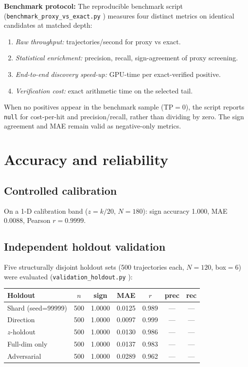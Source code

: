 \documentclass[11pt]{article}
\begin{document}
\textbf{Benchmark protocol:} The reproducible benchmark script (\texttt{benchmark\_proxy\_vs\_exact.py} \cite{deltaproxy_repo}) measures four distinct metrics on identical candidates at matched depth:

\begin{enumerate}
\item \emph{Raw throughput:} trajectories/second for proxy vs exact.
\item \emph{Statistical enrichment:} precision, recall, sign-agreement of proxy screening.
\item \emph{End-to-end discovery speed-up:} GPU-time per exact-verified positive.
\item \emph{Verification cost:} exact arithmetic time on the selected tail.
\end{enumerate}

When no positives appear in the benchmark sample ($\text{TP} = 0$), the script reports \texttt{null} for cost-per-hit and precision/recall, rather than dividing by zero. The sign agreement and MAE remain valid as negative-only metrics.

\section{Accuracy and reliability}
\label{sec:validation}

\subsection{Controlled calibration}

On a 1-D calibration band ($z = k/20$, $N=180$): sign accuracy 1.000, MAE 0.0088, Pearson $r = 0.9999$.

\subsection{Independent holdout validation}

Five structurally disjoint holdout sets (500 trajectories each, $N{=}120$, box${=}6$) were evaluated (\texttt{validation\_holdout.py} \cite{deltaproxy_repo}):

\begin{center}
\begin{tabular}{lcccccc}
\toprule
Holdout & $n$ & sign & MAE & $r$ & prec & rec \\
\midrule
Shard (seed=99999) & 500 & 1.0000 & 0.0125 & 0.989 & --- & --- \\
Direction & 500 & 1.0000 & 0.0097 & 0.999 & --- & --- \\
$z$-holdout & 500 & 1.0000 & 0.0130 & 0.986 & --- & --- \\
Full-dim only & 500 & 1.0000 & 0.0137 & 0.983 & --- & --- \\
Adversarial & 500 & 1.0000 & 0.0289 & 0.962 & --- & --- \\
\bottomrule
\end{tabular}
\end{center}
\end{document}
